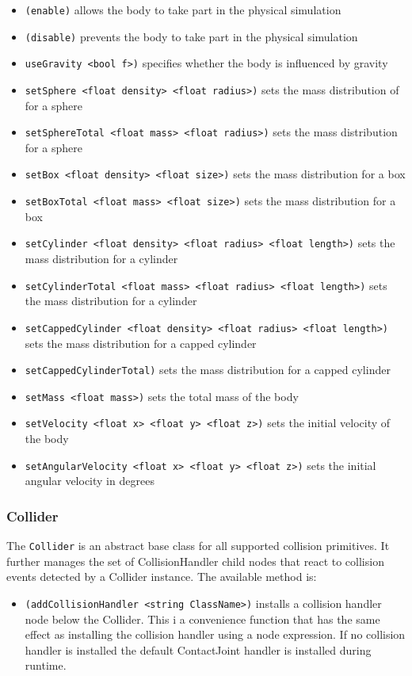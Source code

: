 \begin{itemize}
\item \texttt{(enable)} allows the body to take part in the physical
  simulation
\item \texttt{(disable)} prevents the body to take part in the
  physical simulation
\item \texttt{useGravity <bool f>)} specifies whether the body is
  influenced by gravity
\item \texttt{setSphere <float density> <float radius>)} sets the mass
  distribution of for a sphere
\item \texttt{setSphereTotal <float mass> <float radius>)} sets the
  mass distribution for a sphere
\item \texttt{setBox <float density> <float size>)} sets the
  mass distribution for a box
\item \texttt{setBoxTotal <float mass> <float size>)} sets the mass
  distribution for a box
\item \texttt{setCylinder <float density> <float radius> <float
    length>)} sets the mass distribution for a cylinder
\item \texttt{setCylinderTotal <float mass> <float radius> <float
    length>)} sets the mass distribution for a cylinder
\item \texttt{setCappedCylinder <float density> <float radius> <float
    length>)} sets the mass distribution for a capped cylinder
\item \texttt{setCappedCylinderTotal)} sets the mass distribution for
  a capped cylinder
\item \texttt{setMass <float mass>)} sets the total mass of the body
\item \texttt{setVelocity <float x> <float y> <float z>)} sets the
  initial velocity of the body
\item \texttt{setAngularVelocity <float x> <float y> <float z>)} sets
  the initial angular velocity in degrees
\end{itemize}

\subsubsection{Collider}
The \texttt{Collider} is an abstract base class for all supported
collision primitives. It further manages the set of CollisionHandler
child nodes that react to collision events detected by a Collider
instance. The available method is:

\begin{itemize}
\item \texttt{(addCollisionHandler <string ClassName>)} installs a
  collision handler node below the Collider. This i a convenience
  function that has the same effect as installing the collision
  handler using a node expression. If no collision handler is
  installed the default ContactJoint handler is installed during
  runtime.
\end{itemize}

